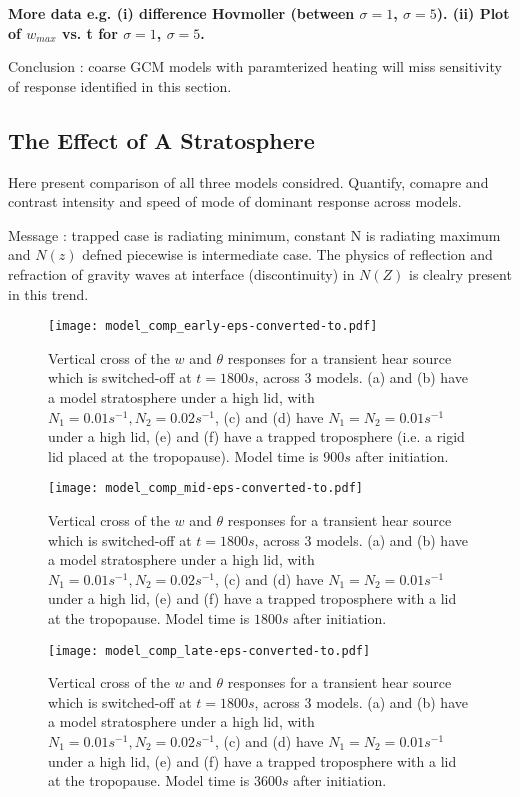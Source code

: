 \documentclass[a4paper,10pt]{article}
\begin{document}
{\bf More data e.g. (i) difference Hovmoller (between $\sigma=1$, $\sigma=5$). (ii) Plot of $w_{max}$ vs. t for $\sigma=1$, $\sigma=5$.}

Conclusion : coarse GCM models with paramterized heating will miss sensitivity of response identified in this section. 
%
%
%
\subsection{The Effect of A Stratosphere}
%
Here present comparison of all three models considred. Quantify, comapre and contrast intensity and speed of mode of dominant response across models.

Message : trapped case is radiating minimum, constant N is radiating maximum and $N(z)$ defned piecewise is intermediate case. The physics of reflection and 
refraction of gravity waves at interface (discontinuity) in $N(Z)$ is clealry present in this trend.  

\FloatBarrier

\begin{figure}[h!]
  \centering
    \texttt{[image: model\_comp\_early-eps-converted-to.pdf]}
  \label{model_comp_early}
  \caption{Vertical cross of the $w$ and $\theta$ responses for a transient hear source which is switched-off at $t = 1800s$, across 3 models. (a) and (b) have a model stratosphere under a high lid, with $N_1 = 0.01s^{-1}, N_2 = 0.02s^{-1}$, (c) and (d) have $N_1 = N_2 = 0.01s^{-1}$ under a high lid, (e) and (f) have a trapped troposphere (i.e. a rigid lid placed at the tropopause). Model time is $900s$ after initiation.  }
  \end{figure}
    
  \begin{figure}[h!]
  \centering
    \texttt{[image: model\_comp\_mid-eps-converted-to.pdf]}
  \label{model_comp_mid}
  \caption{ Vertical cross of the $w$ and $\theta$ responses for a transient hear source which is switched-off at $t = 1800s$, across 3 models. (a) and (b) have a model stratosphere under a high lid, with $N_1 = 0.01s^{-1}, N_2 = 0.02s^{-1}$, (c) and (d) have $N_1 = N_2 = 0.01s^{-1}$ under a high lid, (e) and (f) have a trapped troposphere with a lid at the tropopause. Model time is $1800s$ after initiation.}
  \end{figure}
  
  \begin{figure}[h!]
  \centering
    \texttt{[image: model\_comp\_late-eps-converted-to.pdf]}
  \label{model_comp_late}
  \caption{ Vertical cross of the $w$ and $\theta$ responses for a transient hear source which is switched-off at $t = 1800s$, across 3 models. (a) and (b) have a model stratosphere under a high lid, with $N_1 = 0.01s^{-1}, N_2 = 0.02s^{-1}$, (c) and (d) have $N_1 = N_2 = 0.01s^{-1}$ under a high lid, (e) and (f) have a trapped troposphere with a lid at the tropopause. Model time is $3600s$ after initiation.}
  \end{figure}
  
\end{document}
